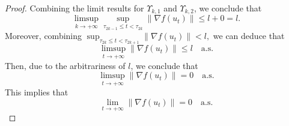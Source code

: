 \documentclass{article} %
\begin{document}
\begin{proof}
Combining the limit results for $\Upsilon_{k,1}$ and $\Upsilon_{k,2}$, we conclude that
\[\limsup_{k \to +\infty} \sup_{\tau_{2k-1} \leq t < \tau_{2k}} \|\nabla f(u_{t})\|\leq l + 0 = l.\]
Moreover, combining $\sup_{\tau_{2k} \leq t < \tau_{2k+1}} \|\nabla f(u_{t})\| < l,$ we can deduce that
\[\limsup_{t \to +\infty} \|\nabla f(u_{t})\| \leq l \quad \text{a.s.}\]
Then, due to the arbitrariness of $l$, we conclude that
\[\limsup_{t \to +\infty} \|\nabla f(u_{t})\| = 0 \quad \text{a.s.}\]
This implies that
\[\lim_{t \to +\infty} \|\nabla f(u_{t})\| = 0 \quad \text{a.s.}\tag*{\qedhere}\]
\end{proof}
\end{document}
